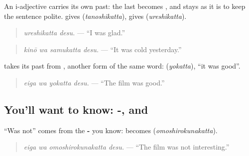 An i-adjective carries its own past: the last \textbf{} becomes \textbf{}, and \textbf{} stays as it is to keep the sentence polite. \textbf{} gives \textbf{} (\emph{tanoshikatta}), \textbf{} gives \textbf{} (\emph{ureshikatta}).

\begin{quote}
\textbf{}
\end{quote}

\begin{quote}
\emph{ureshikatta desu.} — \textquotedblleft{}I was glad.\textquotedblright{}
\end{quote}

\begin{quote}
\textbf{ }
\end{quote}

\begin{quote}
\emph{kinō wa samukatta desu.} — \textquotedblleft{}It was cold yesterday.\textquotedblright{}
\end{quote}

\textbf{} takes its past from \textbf{}, another form of the same word: \textbf{} (\emph{yokatta}), \textquotedblleft{}it was good\textquotedblright{}.

\begin{quote}
\textbf{ }
\end{quote}

\begin{quote}
\emph{eiga wa yokatta desu.} — \textquotedblleft{}The film was good.\textquotedblright{}
\end{quote}

\subsection*{You'll want to know: -, and }
\textquotedblleft{}Was not\textquotedblright{} comes from the \textbf{-} you know: \textbf{} becomes \textbf{} (\emph{omoshirokunakatta}).

\begin{quote}
\textbf{ }
\end{quote}

\begin{quote}
\emph{eiga wa omoshirokunakatta desu.} — \textquotedblleft{}The film was not interesting.\textquotedblright{}
\end{quote}

